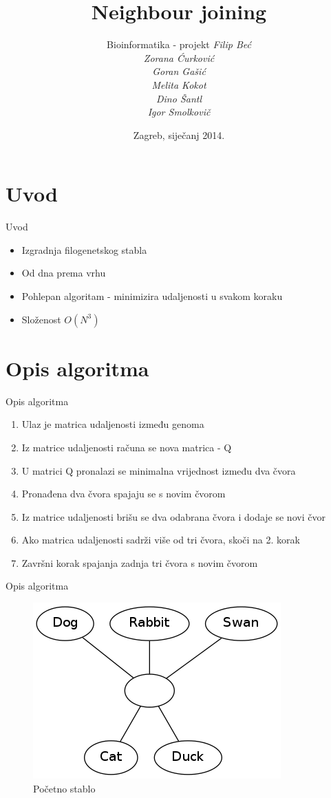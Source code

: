\documentclass[utf8]{beamer}
\title[Neighbour joining]{Neighbour joining}
\author[Dino Šantl]{Bioinformatika - projekt \newline\newline 
				 \itshape		{Filip Beć}\\
				 \itshape{Zorana Ćurković}\\
				 \itshape{Goran Gašić}\\
				 \itshape{Melita Kokot}\\
				 \itshape{Dino Šantl}\\
				 \itshape{Igor Smolkovič}
}
\institute{Fakultet elektrotehnike i računarstva}
\date{Zagreb, siječanj 2014.}
\begin{document}
\begin{frame}
\titlepage
\end{frame}

\section{Uvod}
\begin{frame}{Uvod}
\begin{itemize}
	\item Izgradnja filogenetskog stabla
	\item Od dna prema vrhu
	\item Pohlepan algoritam - minimizira udaljenosti u svakom koraku
	\item Složenost $O(N^3)$
\end{itemize}
\end{frame}

\section{Opis algoritma}
\begin{frame}{Opis algoritma}
\begin{enumerate}
	\item Ulaz je matrica udaljenosti između genoma 
	\pause
	\item Iz matrice udaljenosti računa se nova matrica - Q
	\pause
	\item U matrici Q pronalazi se minimalna vrijednost između dva čvora
	\pause
	\item Pronađena dva čvora spajaju se s novim čvorom
	\pause
	\item Iz matrice udaljenosti brišu se dva odabrana čvora i dodaje se
novi čvor
	\pause
	\item Ako matrica udaljenosti sadrži više od tri čvora, skoči na 2. korak
	\pause
	\item Završni korak spajanja zadnja tri čvora s novim čvorom
\end{enumerate}
\end{frame}

\begin{frame}{Opis algoritma}
\begin{figure}[htb]
\centering
\includegraphics[scale=0.5]{../Dokumentacija/img/pocetni.png}
\caption{Početno stablo}
\end{figure}
\end{frame}
\end{document}
